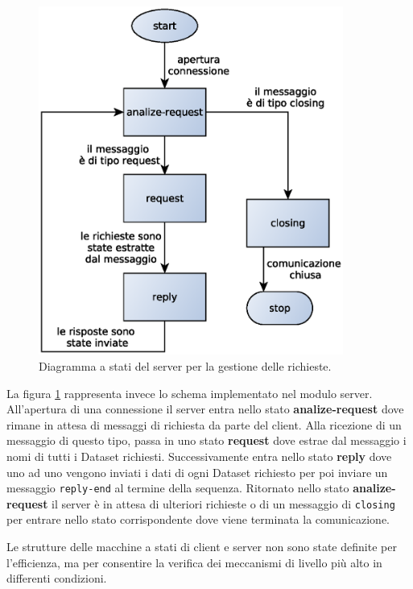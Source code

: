 \begin{figure}
\begin{center}
\includegraphics[width=10cm]{Immagini/StateMachineServer}
\caption{Diagramma a stati del server per la gestione delle richieste.\label{f:stateserver}} 
\end{center} 
\end{figure}

La figura \ref{f:stateserver} rappresenta invece lo schema implementato nel modulo server. All'apertura di una connessione il server entra nello stato \textbf{analize-request} dove rimane in attesa di messaggi di richiesta da parte del client. Alla ricezione di un messaggio di questo tipo, passa in uno stato \textbf{request} dove estrae dal messaggio i nomi di tutti i Dataset richiesti. Successivamente entra nello stato \textbf{reply} dove uno ad uno vengono inviati i dati di ogni Dataset richiesto per poi inviare un messaggio \texttt{reply-end} al termine della sequenza. Ritornato nello stato \textbf{analize-request} il server \`e in attesa di ulteriori richieste o di un messaggio di \texttt{closing} per entrare nello stato corrispondente dove viene terminata la comunicazione.

Le strutture delle macchine a stati di client e server non sono state definite per l'efficienza, ma per consentire la verifica dei meccanismi di livello pi\`u alto in differenti condizioni.







